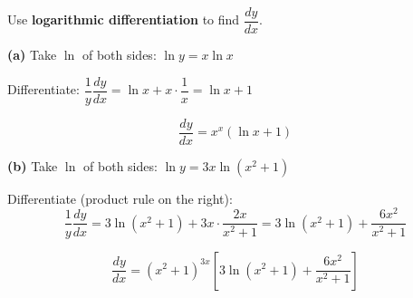 \documentclass[addpoints]{exam}
\begin{document}
\begin{questions}
\question Use \textbf{logarithmic differentiation} to find $\dfrac{dy}{dx}$.
\begin{solution}[9cm]
\textbf{(a)} Take $\ln$ of both sides: $\ln y = x \ln x$

Differentiate:
$\dfrac{1}{y}\dfrac{dy}{dx} = \ln x + x \cdot \dfrac{1}{x} = \ln x + 1$

\[
\boxed{\frac{dy}{dx} = x^x(\ln x + 1)}
\]

\textbf{(b)} Take $\ln$ of both sides: $\ln y = 3x \ln(x^2 + 1)$

Differentiate (product rule on the right):
\[
\frac{1}{y}\frac{dy}{dx} = 3\ln(x^2+1) + 3x \cdot \frac{2x}{x^2+1}
= 3\ln(x^2+1) + \frac{6x^2}{x^2+1}
\]

\[
\boxed{\frac{dy}{dx} = (x^2+1)^{3x}\!\left[3\ln(x^2+1) + \frac{6x^2}{x^2+1}\right]}
\]
\end{solution}

\end{questions}
\end{document}
